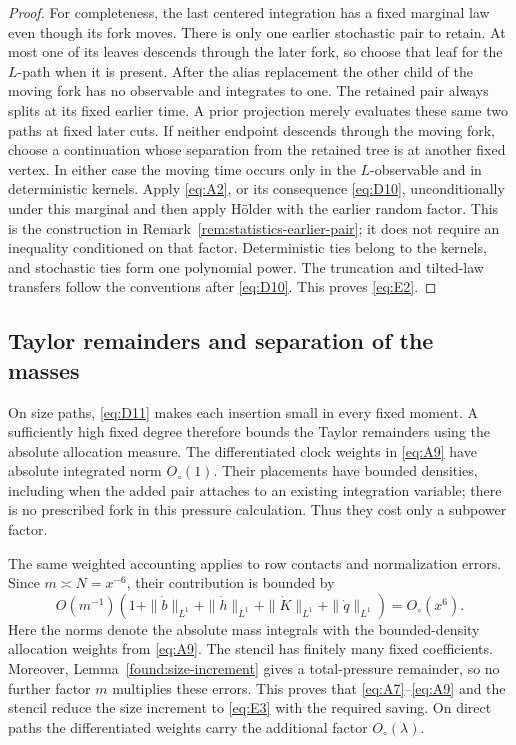 \begin{proof}
For completeness, the last centered integration has a fixed marginal
law even though its fork moves. There is only one earlier stochastic
pair to retain. At most one of its leaves descends through the later
fork, so choose that leaf for the \(L\)-path when it is present. After
the alias replacement the other child of the moving fork has no
observable and integrates to one. The retained pair always splits at
its fixed earlier time. A prior projection merely evaluates these
same two paths at fixed later cuts. If neither endpoint descends
through the moving fork, choose a continuation whose separation from
the retained tree is at another fixed vertex. In either case the
moving time occurs only in the \(L\)-observable and in deterministic
kernels. Apply \eqref{eq:A2}, or its consequence \eqref{eq:D10},
unconditionally under this marginal and then apply H\"older with the
earlier random factor. This is the construction in
Remark~\ref{rem:statistics-earlier-pair}; it does not require an
inequality conditioned on that factor. Deterministic ties belong to
the kernels, and stochastic ties form one polynomial power. The
truncation and tilted-law transfers follow the conventions after
\eqref{eq:D10}. This proves \eqref{eq:E2}.
\end{proof}


\subsection{Taylor remainders and separation of the masses}

On size paths, \eqref{eq:D11} makes each insertion small in every fixed
moment. A sufficiently high fixed degree therefore bounds the Taylor
remainders using the absolute allocation measure. The differentiated
clock weights in \eqref{eq:A9} have absolute integrated norm
\(O_\circ(1)\). Their placements have bounded densities, including when
the added pair attaches to an existing integration variable; there is
no prescribed fork in this pressure calculation. Thus they cost only
a subpower factor.

The same weighted accounting applies to row contacts and normalization
errors. Since \(m\asymp N=x^{-6}\), their contribution is bounded by
\[
 O(m^{-1})\left(1+
   \|\dot b\|_{L^1}+\|\dot h\|_{L^1}
        +\|\dot K\|_{L^1}+\|\dot q\|_{L^1}\right)
       =O_\circ(x^6).
\]
Here the norms denote the absolute mass integrals with the
bounded-density allocation weights from \eqref{eq:A9}. The stencil
has finitely many fixed coefficients. Moreover,
Lemma~\ref{found:size-increment} gives a total-pressure remainder, so
no further factor \(m\) multiplies these errors. This proves that
\eqref{eq:A7}--\eqref{eq:A9} and the stencil reduce the size increment
to \eqref{eq:E3} with the required saving. On direct paths the
differentiated weights carry the additional factor
\(O_\circ(\lambda)\).

